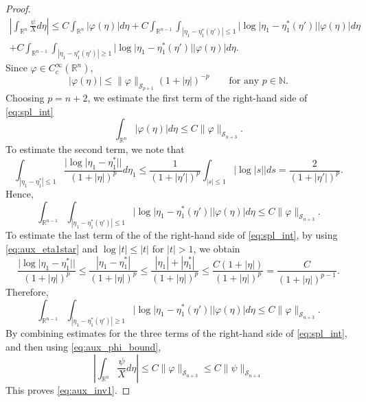 \documentclass[10pt,a4paper]{amsart}
\begin{document}
\begin{proof}
\begin{multline}\label{eq:spl_int}
    \left|\int_{\mathbb{R}^n}\frac{\psi}{X} d\eta\right|
  \leq 
  C\int_{\mathbb{R}^n} |\varphi(\eta)| d\eta
  + C \int_{\mathbb{R}^{n-1}}\int_{|\eta_1 - \eta_1^*(\eta')| \leq 1} |\log|\eta_1-\eta_1^*(\eta')| |\varphi(\eta)| d\eta\\
  + C \int_{\mathbb{R}^{n-1}}\int_{|\eta_1 - \eta_1^*(\eta')| \geq 1} |\log|\eta_1-\eta_1^*(\eta')| |\varphi(\eta)| d\eta.
\end{multline}
Since $\varphi \in C_c^\infty(\mathbb{R}^n)$,
\begin{equation*}
    |\varphi(\eta)|\le\|\varphi\|_{\mathscr{S}_{p+1}}(1+|\eta|)^{-p}
    \qquad
    \text{for any } p\in \mathbb{N}.
\end{equation*}
Choosing $p = n + 2$, we estimate the first term of the right-hand side of \eqref{eq:spl_int}
\begin{equation*}
    \int_{\mathbb{R}^n} |\varphi(\eta)| d\eta \leq C \|\varphi\|_{\mathscr{S}_{n+3}}.
\end{equation*}
To estimate the second term, we note that
\begin{equation*}
    \int_{|\eta_1-\eta_1^*|\leq 1}\frac{|\log|\eta_1-\eta_1^*||}{(1+|\eta|)^p} d\eta_1
    \leq \frac{1}{(1+|\eta'|)^p}\int_{|s|\leq 1}|\log|s|| ds
    = \frac{2}{(1+|\eta'|)^p}.
\end{equation*}
Hence,
\begin{equation*}
    \int_{\mathbb{R}^{n-1}}\int_{|\eta_1 - \eta_1^*(\eta')| \leq 1} |\log|\eta_1-\eta_1^*(\eta')| |\varphi(\eta)| d\eta \leq  C \|\varphi\|_{\mathscr{S}_{n+3}}.
\end{equation*}
To estimate the last term of the of the right-hand side of \eqref{eq:spl_int}, by using \eqref{eq:aux_eta1star} and $\log|t|\le|t|$ for $|t|>1$, we obtain
\begin{equation*}
    \frac{|\log|\eta_1-\eta_1^*||}{(1+|\eta|)^p}
    \leq 
    \frac{|\eta_1-\eta_1^*|}{(1+|\eta|)^p}
    \leq
    \frac{|\eta_1|+|\eta_1^*|}{(1+|\eta|)^p}
    \leq
    \frac{C(1+|\eta|)}{(1+|\eta|)^p}=\frac{C}{(1+|\eta|)^{p-1}}.
\end{equation*}
Therefore,
\begin{equation*}
    \int_{\mathbb{R}^{n-1}}\int_{|\eta_1 - \eta_1^*(\eta')| \geq 1} |\log|\eta_1-\eta_1^*(\eta')| |\varphi(\eta)| d\eta \leq  C \|\varphi\|_{\mathscr{S}_{n+3}}.
\end{equation*}
By combining estimates for the three terms of the right-hand side of \eqref{eq:spl_int}, and then using \eqref{eq:aux_phi_bound}, 
\begin{equation*}
    \left|\int_{\mathbb{R}^n}\frac{\psi}{X}d\eta\right|
    \leq C\|\varphi\|_{\mathscr{S}_{n+3}}
    \leq C\|\psi\|_{\mathscr{S}_{n+4}}
\end{equation*}
This proves \eqref{eq:aux_inv1}.


\end{proof}
\end{document}

